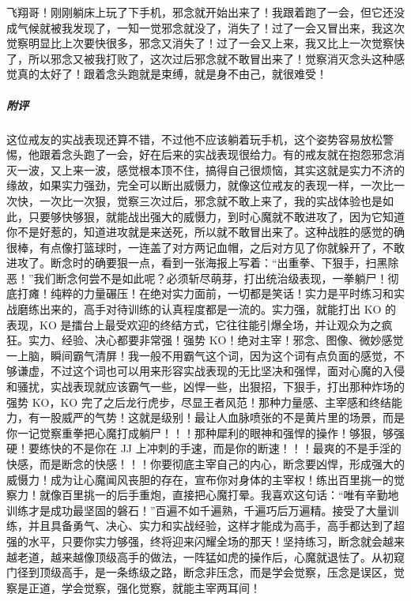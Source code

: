 \begin{case}
    飞翔哥！刚刚躺床上玩了下手机，邪念就开始出来了！我跟着跑了一会，但它还没成气候就被我发现了，一知一觉邪念就没了，消失了！过了一会又冒出来，我这次觉察明显比上次要快很多，邪念又消失了！过了一会又上来，我又比上一次觉察快了，所以邪念又被我打败了，这次过后邪念就不敢冒出来了！觉察消灭念头这种感觉真的太好了！跟着念头跑就是束缚，就是身不由己，就很难受！
    \subparagraph{附评} 这位戒友的实战表现还算不错，不过他不应该躺着玩手机，这个姿势容易放松警惕，他跟着念头跑了一会，好在后来的实战表现很给力。有的戒友就在抱怨邪念消灭一波，又上来一波，感觉根本顶不住，搞得自己很烦恼，其实这就是实力不济的缘故，如果实力强劲，完全可以断出威慑力，就像这位戒友的表现一样，一次比一次快，一次比一次狠，觉察三次过后，邪念就不敢上来了，我的实战体验也是如此，只要够快够狠，就能战出强大的威慑力，到时心魔就不敢进攻了，因为它知道你不是好惹的，知道进攻就是来送死，所以就不敢冒出来了。这种战胜的感觉的确很棒，有点像打篮球时，一连盖了对方两记血帽，之后对方见了你就躲开了，不敢进攻了。断念时的确要狠一点，看到一张海报上写着：“出重拳、下狠手，扫黑除恶！”我们断念何尝不是如此呢？必须斩尽萌芽，打出统治级表现，一拳躺尸！彻底打瘫！纯粹的力量碾压！在绝对实力面前，一切都是笑话！实力是平时练习和实战磨练出来的，高手对待训练的认真程度都是一流的。实力强，就能打出 KO 的表现，KO 是擂台上最受欢迎的终结方式，它往往能引爆全场，并让观众为之疯狂。实力、经验、决心都要非常强！强势 KO！绝对主宰！邪念、图像、微妙感觉一上脑，瞬间霸气清屏！我一般不用霸气这个词，因为这个词有点负面的感觉，不够谦虚，不过这个词也可以用来形容实战表现的无比坚决和强悍，面对心魔的入侵和骚扰，实战表现就应该霸气一些，凶悍一些，出狠招，下狠手，打出那种炸场的强势 KO，KO 完了之后龙行虎步，尽显王者风范！那种力量感、主宰感和终结能力，有一股威严的气势！这就是级别！最让人血脉喷张的不是黄片里的场景，而是你一记觉察重拳把心魔打成躺尸！！！那种犀利的眼神和强悍的操作！够狠，够强硬！要练快的不是你在 JJ 上冲刺的手速，而是你的断速！！！最爽的不是手淫的快感，而是断念的快感！！！你要彻底主宰自己的内心，断念要凶悍，形成强大的威慑力！成为让心魔闻风丧胆的存在，宣布你对身体的主宰权！练出百里挑一的觉察力！就像百里挑一的后手重炮，直接把心魔打晕。我喜欢这句话：“唯有辛勤地训练才是成功最坚固的磐石！”百遍不如千遍熟，千遍巧后万遍精。接受了大量训练，并且具备勇气、决心、实力和实战经验，这样才能成为高手，高手都达到了超强的水平，只要你实力够强，终将迎来闪耀全场的那天！坚持练习，断念就会越来越老道，越来越像顶级高手的做法，一阵猛如虎的操作后，心魔就退怯了。从初窥门径到顶级高手，是一条练级之路，断念非压念，而是学会觉察，压念是误区，觉察是正道，学会觉察，强化觉察，就能主宰两耳间！


\end{case}
